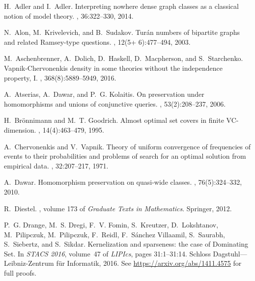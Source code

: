 \documentclass[11pt, fleqn]{article}
\theoremstyle{plain}
\theoremstyle{nonumberplain}
\begin{document}
\begin{thebibliography}{10}

H.~Adler and I.~Adler.
\newblock Interpreting nowhere dense graph classes as a classical notion of
  model theory.
, 36:322--330, 2014.

N.~Alon, M.~Krivelevich, and B.~Sudakov.
\newblock Tur{\'a}n numbers of bipartite graphs and related {R}amsey-type
  questions.
, 12(5+ 6):477--494,
  2003.

M.~Aschenbrenner, A.~Dolich, D.~Haskell, D.~Macpherson, and S.~Starchenko.
\newblock Vapnik-{C}hervonenkis density in some theories without the
  independence property, {I}.
,
  368(8):5889--5949, 2016.

A.~Atserias, A.~Dawar, and P.~G. Kolaitis.
\newblock On preservation under homomorphisms and unions of conjunctive
  queries.
, 53(2):208--237, 2006.

H.~Br{\"{o}}nnimann and M.~T. Goodrich.
\newblock Almost optimal set covers in finite {VC}-dimension.
, 14(4):463--479, 1995.

A.~Chervonenkis and V.~Vapnik.
\newblock Theory of uniform convergence of frequencies of events to their
  probabilities and problems of search for an optimal solution from empirical
  data.
, 32:207--217, 1971.

A.~Dawar.
\newblock Homomorphism preservation on quasi-wide classes.
, 76(5):324--332, 2010.

R.~Diestel.
, volume 173 of {\em Graduate {T}exts
  in {M}athematics}.
\newblock Springer, 2012.

P.~G. Drange, M.~S. Dregi, F.~V. Fomin, S.~Kreutzer, D.~Lokshtanov,
  M.~Pilipczuk, M.~Pilipczuk, F.~Reidl, F.~{S{\'{a}}nchez Villaamil},
  S.~Saurabh, S.~Siebertz, and S.~Sikdar.
\newblock Kernelization and sparseness: the case of {D}ominating {S}et.
\newblock In {\em {STACS 2016}}, volume~47 of {\em LIPIcs}, pages 31:1--31:14.
  Schloss Dagstuhl---Leibniz-Zentrum f\"ur Informatik, 2016.
\newblock See \url{https://arxiv.org/abs/1411.4575} for full proofs.


\end{thebibliography}
\end{document}
